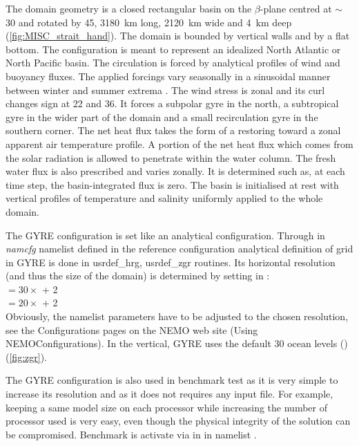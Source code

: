 \documentclass[../main/NEMO_manual]{subfiles}
\begin{document}
The domain geometry is a closed rectangular basin on the $\beta$-plane centred at $\sim$ 30 and
rotated by 45\deg, 3180~km long, 2120~km wide and 4~km deep (\autoref{fig:MISC_strait_hand}).
The domain is bounded by vertical walls and by a flat bottom.
The configuration is meant to represent an idealized North Atlantic or North Pacific basin.
The circulation is forced by analytical profiles of wind and buoyancy fluxes.
The applied forcings vary seasonally in a sinusoidal manner between winter and summer extrema \citep{Levy_al_OM10}. 
The wind stress is zonal and its curl changes sign at 22 and 36.
It forces a subpolar gyre in the north, a subtropical gyre in the wider part of the domain and
a small recirculation gyre in the southern corner.
The net heat flux takes the form of a restoring toward a zonal apparent air temperature profile.
A portion of the net heat flux which comes from the solar radiation is allowed to penetrate within the water column.
The fresh water flux is also prescribed and varies zonally.
It is determined such as, at each time step, the basin-integrated flux is zero.
The basin is initialised at rest with vertical profiles of temperature and salinity uniformly applied to
the whole domain.

The GYRE configuration is set like an analytical configuration.
Through  in \textit{namcfg} namelist defined in
the reference configuration 
analytical definition of grid in GYRE is done in usrdef\_hrg, usrdef\_zgr routines.
Its horizontal resolution (and thus the size of the domain) is determined by
setting  in : \\
 $= 30 \times$  + 2   \\
 $= 20 \times$  + 2   \\
Obviously, the namelist parameters have to be adjusted to the chosen resolution,
see the Configurations pages on the NEMO web site (Using NEMO\/Configurations).
In the vertical, GYRE uses the default 30 ocean levels () (\autoref{fig:zgr}).

The GYRE configuration is also used in benchmark test as it is very simple to increase its resolution and
as it does not requires any input file.
For example, keeping a same model size on each processor while increasing the number of processor used is very easy,
even though the physical integrity of the solution can be compromised.
Benchmark is activate via  in  in
namelist .
\end{document}
